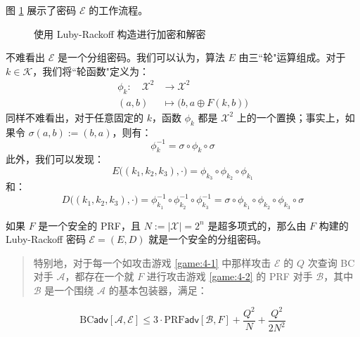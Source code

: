 \noindent
图 \ref{fig:4-14} 展示了密码 $\mathcal{E}$ 的工作流程。

\begin{figure}
  \centering
  \subfigure[加密]{}
  \quad\quad\quad\quad
  \subfigure[解密]{}
  \caption{使用 Luby-Rackoff 构造进行加密和解密}
  \label{fig:4-14}
\end{figure}

不难看出 $\mathcal{E}$ 是一个分组密码。我们可以认为，算法 $E$ 由三``轮"运算组成。对于 $k\in\mathcal{K}$，我们将``轮函数"定义为：
\[
\begin{aligned}
\phi_k:\quad\mathcal{X}^2 & \to \mathcal{X}^2\\
(a,b) & \mapsto \big(b,a\oplus F(k,b)\big)
\end{aligned}
\]
同样不难看出，对于任意固定的 $k$，函数 $\phi_k$ 都是 $\mathcal{X}^2$ 上的一个置换；事实上，如果令 $\sigma(a,b):=(b,a)$，则有：
\[
\phi_k^{-1}=\sigma\circ\phi_k\circ\sigma
\]
此外，我们可以发现：
\[
E\big((k_1,k_2,k_3),\cdot\big)
=\phi_{k_3}\circ\phi_{k_2}\circ\phi_{k_1} 
\]
和：
\[
D\big((k_1,k_2,k_3),\cdot\big)
=\phi^{-1}_{k_1}\circ\phi^{-1}_{k_2}\circ\phi^{-1}_{k_3}
=\sigma\circ\phi_{k_1}\circ\phi_{k_2}\circ\phi_{k_3}\circ\sigma
\]

\begin{theorem}
如果 $F$ 是一个安全的 PRF，且 $N:=|\mathcal{X}|=2^n$ 是超多项式的，那么由 $F$ 构建的 Luby-Rackoff 密码 $\mathcal{E}=(E,D)$ 就是一个安全的分组密码。
\begin{quote}
特别地，对于每一个如攻击游戏 \ref{game:4-1} 中那样攻击 $\mathcal{E}$ 的 $Q$ 次查询 BC 对手 $\mathcal{A}$，都存在一个就 $F$ 进行攻击游戏 \ref{game:4-2} 的 PRF 对手 $\mathcal{B}$，其中 $\mathcal{B}$ 是一个围绕 $\mathcal{A}$ 的基本包装器，满足：
\end{quote}
\[
\mathrm{BC}\mathsf{adv}[\mathcal{A},\mathcal{E}]
\leq3\cdot
\mathrm{PRF}\mathsf{adv}[\mathcal{B},F]
+\frac{Q^2}{N}
+\frac{Q^2}{2N^2}
\]
\end{theorem}

